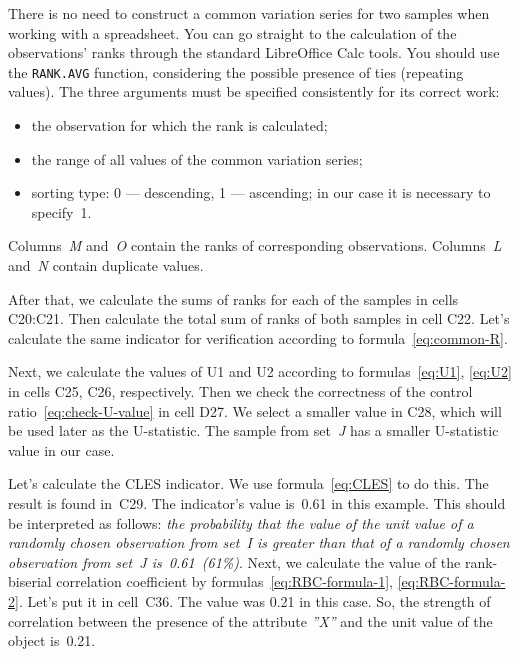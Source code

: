 \documentclass[]{scrreprt}
\begin{document}
There is no need to construct a common variation series for two samples when working with a spreadsheet. You can go straight to the calculation of the observations' ranks through the standard LibreOffice Calc tools. You should use the \texttt{RANK.AVG} function, considering the possible presence of ties (repeating values). The three arguments must be specified consistently for its correct work:
\begin{itemize}
	\item the observation for which the rank is calculated;
	\item the range of all values of the common variation series;
	\item sorting type: 0 --- descending, 1 --- ascending; in our case it is necessary to specify~1.
\end{itemize}
Columns~\textit{M} and~\textit{O} contain the ranks of corresponding observations. Columns~\textit{L} and~\textit{N} contain duplicate values.

After that, we calculate the sums of ranks for each of the samples in cells C20:C21. Then calculate the total sum of ranks of both samples in cell C22. Let's calculate the same indicator for verification according to formula~\ref{eq:common-R}.

Next, we calculate the values of U1 and U2 according to formulas~\ref{eq:U1}, \ref{eq:U2} in cells C25, C26, respectively. Then we check the correctness of the control ratio~\ref{eq:check-U-value} in cell D27. We select a smaller value in C28, which will be used later as the U-statistic. The sample from set~\textit{J} has a smaller U-statistic value in our case.

Let's calculate the CLES indicator. We use formula~\ref{eq:CLES} to do this. The result is found in~C29. The indicator's value is~0.61 in this example. This should be interpreted as follows: \emph{the probability that the value of the unit value of a randomly chosen observation from set~\textit{I} is greater than that of a randomly chosen observation from set~\textit{J} is~0.61~(61\%)}. Next, we calculate the value of the rank-biserial correlation coefficient by formulas~\ref{eq:RBC-formula-1}, \ref{eq:RBC-formula-2}. Let's put it in cell~C36. The value was 0.21 in this case. So, the strength of correlation between the presence of the attribute \textit{''X''} and the unit value of the object is~0.21.
\end{document}

